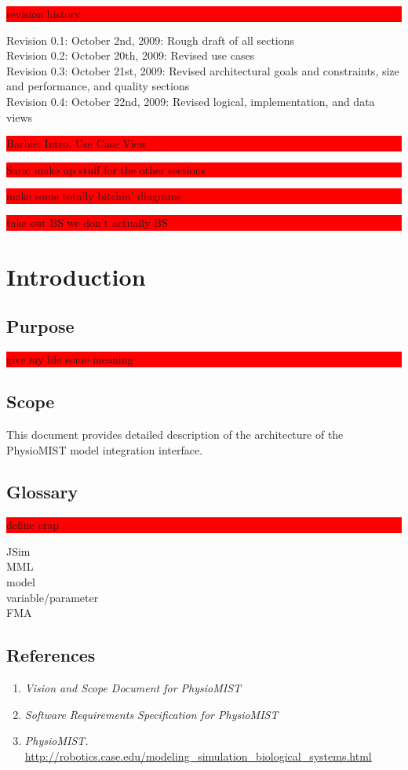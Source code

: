 \documentclass{article}
\title{\todo{PhysioMIST Design Crap}}
\author{Mark Caral, Sara Cummins, BarbaraJoy Jones, Joshua Lee}
\date{October 23, 2009\\{\sc Eecs} 393}
\newcommand{\todo}[1]{\colorbox{red}{\begin{minipage}{\textwidth}{#1}\end{minipage}}}
\begin{document}
\begin{titlepage}
\maketitle\thispagestyle{empty}
\end{titlepage}

\todo{revision history}
Revision 0.1: October 2nd, 2009: Rough draft of all sections\\
Revision 0.2: October 20th, 2009: Revised use cases\\
Revision 0.3: October 21st, 2009: Revised architectural goals and constraints, size and performance, and quality sections\\
Revision 0.4: October 22nd, 2009: Revised logical, implementation, and data views\\
\newline
\todo{Barbie: Intro, Use Case View}
\todo{Sara: make up stuff for the other sections}
\newpage

\tableofcontents
\newpage

\todo{make some totally bitchin' diagrams}
\todo{take out BS we don't actually BS}

\section{Introduction}
\subsection{Purpose}
\todo{give my life some meaning}
\subsection{Scope}
This document provides detailed description of the architecture of the PhysioMIST model integration interface.
\subsection{Glossary}
\todo{define crap}
JSim\\
MML\\
model\\
variable/parameter\\
FMA
\subsection{References}
\begin{enumerate}
\item \emph{Vision and Scope Document for PhysioMIST}
\item \emph{Software Requirements Specification for PhysioMIST}
\item \emph{PhysioMIST.} \url{http://robotics.case.edu/modeling_simulation_biological_systems.html}
\end{enumerate}
\end{document}

